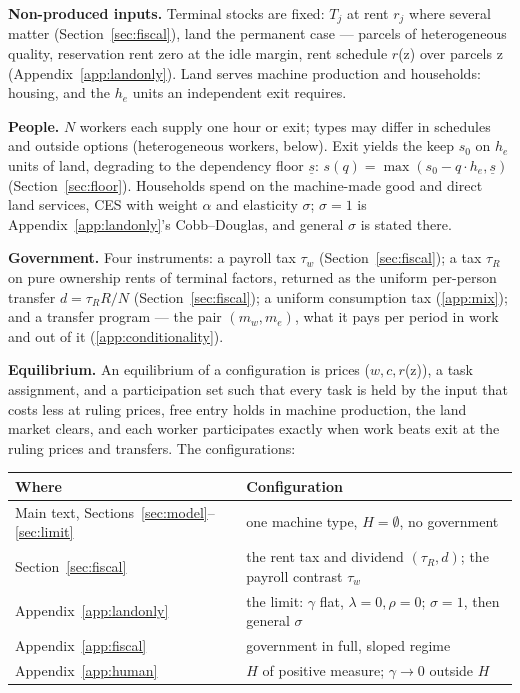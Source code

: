 \documentclass[12pt]{article}
\theoremstyle{plain}
\begin{document}
\textbf{Non-produced inputs.} Terminal stocks are fixed: $T_j$ at rent $r_j$ where several matter (Section~\ref{sec:fiscal}), land the permanent case --- parcels of heterogeneous quality, reservation rent zero at the idle margin, rent schedule $r$(z) over parcels z (Appendix~\ref{app:landonly}). Land serves machine production and households: housing, and the $h_e$ units an independent exit requires.

\textbf{People.} $N$ workers each supply one hour or exit; types may differ in schedules and outside options (heterogeneous workers, below). Exit yields the keep $s_0$ on $h_e$ units of land, degrading to the dependency floor $\underline{s}$: $s(q) = \max(s_0 - q\cdot h_e, \underline{s})$ (Section~\ref{sec:floor}). Households spend on the machine-made good and direct land services, CES with weight $\alpha$ and elasticity $\sigma$; $\sigma = 1$ is Appendix~\ref{app:landonly}'s Cobb--Douglas, and general $\sigma$ is stated there.

\textbf{Government.} Four instruments: a payroll tax $\tau _w$ (Section~\ref{sec:fiscal}); a tax $\tau _R$ on pure ownership rents of terminal factors, returned as the uniform per-person transfer $d = \tau _R R/N$ (Section~\ref{sec:fiscal}); a uniform consumption tax (\ref{app:mix}); and a transfer program --- the pair $(m_w, m_e)$, what it pays per period in work and out of it (\ref{app:conditionality}).

\textbf{Equilibrium.} An equilibrium of a configuration is prices ($w, c, r$(z)), a task assignment, and a participation set such that every task is held by the input that costs less at ruling prices, free entry holds in machine production, the land market clears, and each worker participates exactly when work beats exit at the ruling prices and transfers. The configurations:

\begin{center}
{\small
\begin{tabular}{l p{8.6cm}}
\toprule
Where & Configuration \\
\midrule
Main text, Sections~\ref{sec:model}--\ref{sec:limit} & one machine type, $H = \emptyset$, no government \\
Section~\ref{sec:fiscal} & the rent tax and dividend $(\tau _R, d)$; the payroll contrast $\tau _w$ \\
Appendix~\ref{app:landonly} & the limit: $\gamma$ flat, $\lambda = 0, \rho = 0$; $\sigma = 1$, then general $\sigma$ \\
Appendix~\ref{app:fiscal} & government in full, sloped regime \\
Appendix~\ref{app:human} & $H$ of positive measure; $\gamma \to 0$ outside $H$ \\
\bottomrule
\end{tabular}
}
\end{center}
\end{document}
